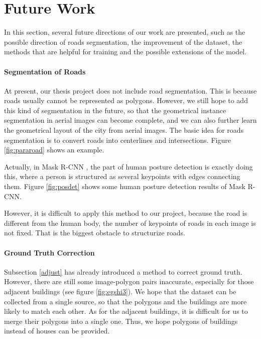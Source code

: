 \section{Future Work}\label{ftrwrk}
In this section, several future directions of our work are presented, such as the possible direction of roads segmentation, the improvement of the dataset, the methods that are helpful for training and the possible extensions of the model.

\paragraph{Segmentation of Roads}
At present, our thesis project does not include road segmentation. This is because roads usually cannot be represented as polygons. However, we still hope to add this kind of segmentation in the future, so that the geometrical instance segmentation in aerial images can become complete, and we can also further learn the geometrical layout of the city from aerial images. The basic idea for roads segmentation is to convert roads into centerlines and intersections. Figure \ref{fig:pararoad} shows an example.



Actually, in Mask R-CNN \cite{maskrcnn}, the part of human posture detection is exactly doing this, where a person is structured as several keypoints with edges connecting them. Figure \ref{fig:posdet} shows some human posture detection results of Mask R-CNN.



However, it is difficult to apply this method to our project, because the road is different from the human body, the number of keypoints of roads in each image is not fixed. That is the biggest obstacle to structurize roads.

\paragraph{Ground Truth Correction}
Subsection \ref{adjust} has already introduced a method to correct ground truth. However, there are still some image-polygon pairs inaccurate, especially for those adjacent buildings (see figure \ref{fig:egshi3}). We hope that the dataset can be collected from a single source, so that the polygons and the buildings are more likely to match each other. As for the adjacent buildings, it is difficult for us to merge their polygons into a single one. Thus, we hope polygons of buildings instead of houses can be provided.

